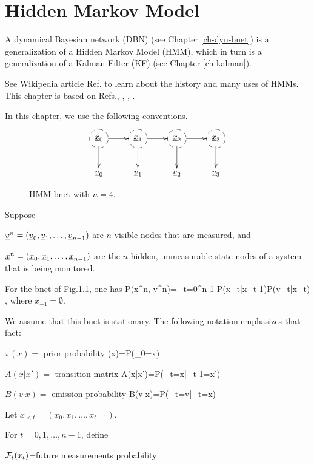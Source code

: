 \chapter{Hidden Markov Model}
\label{ch-hmm}

A dynamical Bayesian
network (DBN)  (see Chapter
\ref{ch-dyn-bnet})
is a generalization
of a
Hidden Markov Model (HMM), which
in turn is 
 a  generalization of a
Kalman Filter (KF) (see Chapter
\ref{ch-kalman}).

See Wikipedia article 
Ref.\cite{wiki-hmm} to learn 
about the history 
and many uses of HMMs. This
chapter is based on
Refs.\cite{nuel}, \cite{wiki-hmm},
\cite{wiki-viterbi}, \cite{wiki-baum}.

In this
chapter,
we use the following conventions.

\bnetInstantiations

\hiddenNodes


\begin{figure}[h!]
\centering
$$\xymatrix{
*++[F-o]{\rvx_0}\ar[d]\ar[r]&
*++[F-o]{\rvx_1}\ar[d]\ar[r]&
*++[F-o]{\rvx_2}\ar[d]\ar[r]&
*++[F-o]{\rvx_3}\ar[d]\\
\rvv_0&
\rvv_1&
\rvv_2&
\rvv_3
}$$
\caption{HMM bnet
with $n=4$.}
\label{fig-hmm}
\end{figure}

Suppose 

${\underline{v}}^n=({\underline{v}}_0, {\underline{v}}_1, 
\ldots, {\underline{v}}_{n-1})$
are $n$ visible nodes that
are measured,
and 

${\underline{x}}^n=({\underline{x}}_0, {\underline{x}}_1, 
\ldots, {\underline{x}}_{n-1})$
are the $n$ hidden, unmeasurable 
state nodes of a system
that is being monitored.



For the bnet of Fig.\ref{fig-hmm},
one has
\beq
P(x^n, v^n)=\prod_{t=0}^{n-1}
P(x_t|x_{t-1})P(v_t|x_t)
\;,
\eeq
where $x_{-1}=\emptyset$.

We assume that this bnet is stationary.
The following notation
emphasizes that fact:

$\pi(x)=$ prior probability
\beq
\pi(x)=P(\rvx_0=x)
\eeq

$A(x|x')=$ transition matrix
\beq
A(x|x')=P(\rvx_t=x|\rvx_{t-1}=x')
\eeq

$B(v|x)=$ emission probability
\beq
B(v|x)=P(\rvv_t=v|\rvx_t=x)
\eeq


Let
$x_{<t} =(x_0, x_1, \dots, x_{t-1})$.

For $t=0,1, \dots, n-1$, define

${\cal F}_t(x_t)$=future measurements probability


